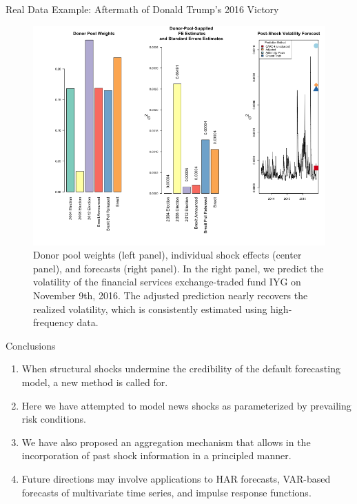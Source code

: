 \documentclass{beamer} %
\begin{document}
\begin{frame}[t]
\begin{columns}[t]
\begin{column}{0.465\textwidth}
\begin{block}{Real Data Example: Aftermath of Donald Trump's 2016 Victory}
	\begin{figure}
		\includegraphics[width=\linewidth]{../real_data_output_plots/WedSep182237432024_IYG_None_None.png}
		\caption{Donor pool weights (left panel), individual shock effects (center panel), and forecasts (right panel).  In the right panel, we predict the volatility of the financial services exchange-traded fund IYG on November 9th, 2016.  The adjusted prediction nearly recovers the realized volatility, which is consistently estimated using high-frequency data.} 
	\end{figure}
\end{block}


\begin{block}{Conclusions}
	\begin{enumerate}
		\item When structural shocks undermine the credibility of the default forecasting model, a new method is called for.
		\item Here we have attempted to model news shocks as parameterized by prevailing risk conditions.
		\item We have also proposed an aggregation mechanism that allows in the incorporation of past shock information in a principled manner.
		\item Future directions may involve applications to HAR forecasts, VAR-based forecasts of multivariate time series, and impulse response functions.
	\end{enumerate}
\end{block}


\end{column}
\end{columns}
\end{frame}
\end{document}

